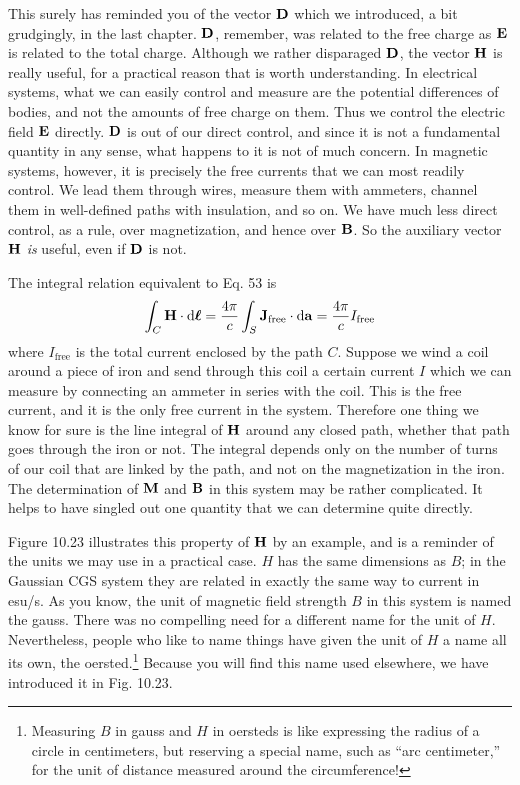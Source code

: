 This surely has reminded you of the vector $\mathbf{D}$ which we introduced,
a bit grudgingly, in the last chapter. $\mathbf{D}$, remember, was related to
the free charge as $\mathbf{E}$ is related to the total charge. Although we rather
disparaged $\mathbf{D}$, the vector $\mathbf{H}$ is really useful, for a practical reason that
is worth understanding. In electrical systems, what we can easily
control and measure are the potential differences of bodies, and not
the amounts of free charge on them. Thus we control the electric
field $\mathbf{E}$ directly. $\mathbf{D}$ is out of our direct control, and since it is not a
fundamental quantity in any sense, what happens to it is not of much
concern. In magnetic systems, however, it is precisely the free currents
that we can most readily control. We lead them through wires,
measure them with ammeters, channel them in well-defined paths
with insulation, and so on. We have much less direct control, as a
rule, over magnetization, and hence over $\mathbf{B}$. So the auxiliary vector
$\mathbf{H}$ \emph{is} useful, even if $\mathbf{D}$ is not.

The integral relation equivalent to Eq. 53 is
\begin{equation}
  \int_C\mathbf{H}\cdot\operatorname{d\!}\boldsymbol{\ell} = \frac{4\pi}{c}\int_S\mathbf{J}_\text{free}\cdot\operatorname{d\!}\mathbf{a}
            = \frac{4\pi}{c}I_\text{free}
\end{equation}
where $I_\text{free}$ is the total current enclosed by the path $C$. Suppose we
wind a coil around a piece of iron and send through this coil a certain
current $I$ which we can measure by connecting an ammeter in
series with the coil. This is the free current, and it is the only free
current in the system. Therefore one thing we know for sure is the
line integral of $\mathbf{H}$ around any closed path, whether that path goes
through the iron or not. The integral depends only on the number
of turns of our coil that are linked by the path, and not on the magnetization
in the iron. The determination of $\mathbf{M}$ and $\mathbf{B}$ in this system
may be rather complicated. It helps to have singled out one quantity
that we can determine quite directly.

Figure 10.23 illustrates this property of $\mathbf{H}$ by an example, and is
a reminder of the units we may use in a practical case. $H$ has the
same dimensions as $B$; in the Gaussian CGS system they are related
in exactly the same way to current in esu/s. As you know, the
unit of magnetic field strength $B$ in this system is named the gauss.
There was no compelling need for a different name for the unit of $H$.
Nevertheless, people who like to name things have given the unit
of $H$ a name all its own, 
the oersted.\footnote{Measuring $B$ in gauss and $H$ in oersteds is
like expressing the radius of a circle in
centimeters, but reserving a special name, such as ``arc centimeter,'' for the unit of distance
measured around the circumference!} Because you will find this
name used elsewhere, we have introduced it in Fig. 10.23.

